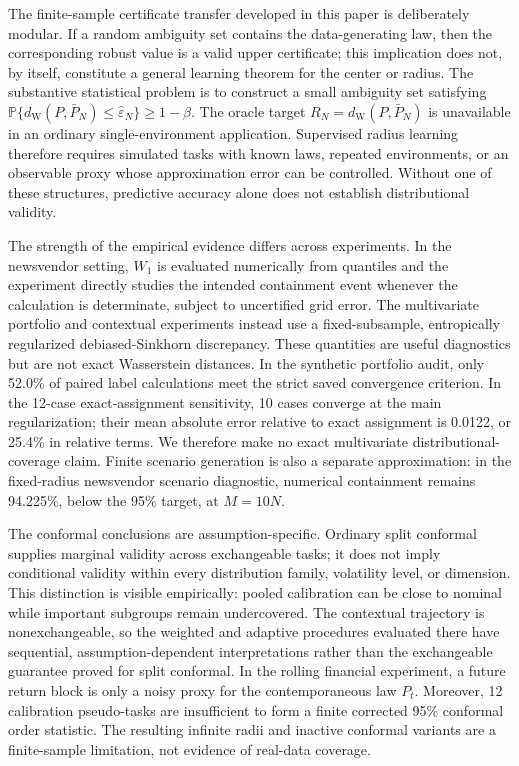 \documentclass[11pt]{article}
\newcommand{\Prob}{\mathbb{P}}
\newcommand{\1}{\mathbf{1}}
\newcommand{\dW}{d_{\mathrm W}}
\newcommand{\Pbar}{\bar P_N}
\newcommand{\epshat}{\widehat\varepsilon_N}
\begin{document}
The finite-sample certificate transfer developed in this paper is deliberately modular.  If a random ambiguity set contains the data-generating law, then the corresponding robust value is a valid upper certificate; this implication does not, by itself, constitute a general learning theorem for the center or radius.  The substantive statistical problem is to construct a small ambiguity set satisfying $\Prob\{\dW(P,\Pbar)\le\epshat\}\ge1-\beta$.  The oracle target $R_N=\dW(P,\Pbar)$ is unavailable in an ordinary single-environment application.  Supervised radius learning therefore requires simulated tasks with known laws, repeated environments, or an observable proxy whose approximation error can be controlled.  Without one of these structures, predictive accuracy alone does not establish distributional validity.

The strength of the empirical evidence differs across experiments.  In the newsvendor setting, $W_1$ is evaluated numerically from quantiles and the experiment directly studies the intended containment event whenever the calculation is determinate, subject to uncertified grid error.  The multivariate portfolio and contextual experiments instead use a fixed-subsample, entropically regularized debiased-Sinkhorn discrepancy.  These quantities are useful diagnostics but are not exact Wasserstein distances.  In the synthetic portfolio audit, only 52.0\% of paired label calculations meet the strict saved convergence criterion.  In the 12-case exact-assignment sensitivity, 10 cases converge at the main regularization; their mean absolute error relative to exact assignment is 0.0122, or 25.4\% in relative terms.  We therefore make no exact multivariate distributional-coverage claim.  Finite scenario generation is also a separate approximation: in the fixed-radius newsvendor scenario diagnostic, numerical containment remains 94.225\%, below the 95\% target, at $M=10N$.

The conformal conclusions are assumption-specific.  Ordinary split conformal supplies marginal validity across exchangeable tasks; it does not imply conditional validity within every distribution family, volatility level, or dimension.  This distinction is visible empirically: pooled calibration can be close to nominal while important subgroups remain undercovered.  The contextual trajectory is nonexchangeable, so the weighted and adaptive procedures evaluated there have sequential, assumption-dependent interpretations rather than the exchangeable guarantee proved for split conformal.  In the rolling financial experiment, a future return block is only a noisy proxy for the contemporaneous law $P_t$.  Moreover, 12 calibration pseudo-tasks are insufficient to form a finite corrected 95\% conformal order statistic.  The resulting infinite radii and inactive conformal variants are a finite-sample limitation, not evidence of real-data coverage.
\end{document}
